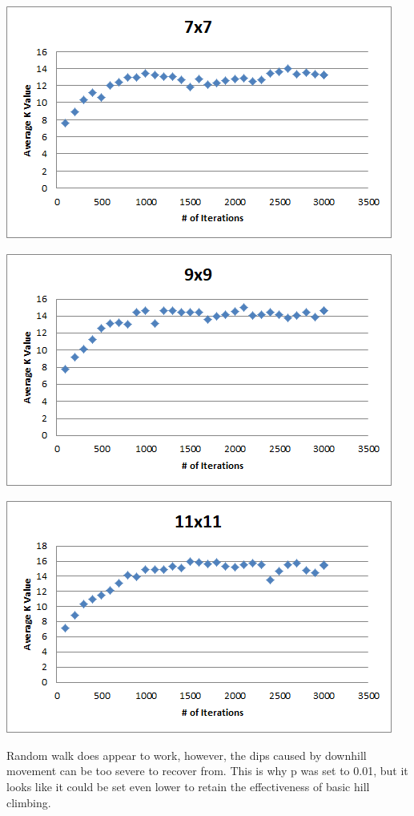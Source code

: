 \documentclass[12pt, letterpaper]{article}
\begin{document}
\includegraphics[width=\linewidth]{"Task 5/7x7 Scatterplot"}

\includegraphics[width=\linewidth]{"Task 5/9x9 Scatterplot"}

\includegraphics[width=\linewidth]{"Task 5/11x11 Scatterplot"}

Random walk does appear to work, however, the dips caused by downhill movement can be too severe to recover from. This is why p was set to 0.01, but it looks like it could be set even lower to retain the effectiveness of basic hill climbing. 
\end{document}
